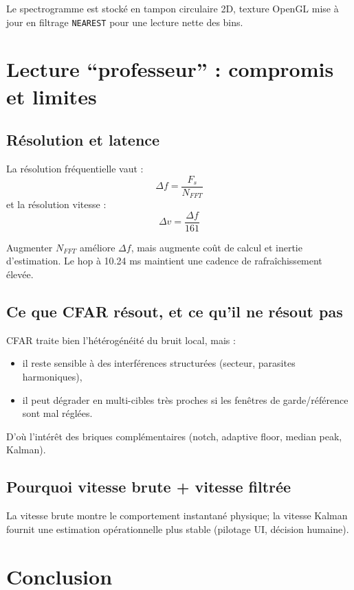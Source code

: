\documentclass[a4paper,11pt]{article}
\begin{document}
Le spectrogramme est stock\'e en tampon circulaire 2D, texture OpenGL mise \`a jour en filtrage \texttt{NEAREST} pour une lecture nette des bins.

\section{Lecture ``professeur'' : compromis et limites}

\subsection{R\'esolution et latence}

La r\'esolution fr\'equentielle vaut :
\[
\Delta f = \frac{F_s}{N_{FFT}}
\]
et la r\'esolution vitesse :
\[
\Delta v = \frac{\Delta f}{161}
\]

Augmenter \(N_{FFT}\) am\'eliore \(\Delta f\), mais augmente co\^ut de calcul et inertie d'estimation. Le hop \`a 10.24 ms maintient une cadence de rafra\^ichissement \'elev\'ee.

\subsection{Ce que CFAR r\'esout, et ce qu'il ne r\'esout pas}

CFAR traite bien l'h\'et\'erog\'en\'eit\'e du bruit local, mais :
\begin{itemize}[leftmargin=2em]
  \item il reste sensible \`a des interférences structur\'ees (secteur, parasites harmoniques),
  \item il peut d\'egrader en multi-cibles tr\`es proches si les fen\^etres de garde/r\'ef\'erence sont mal r\'egl\'ees.
\end{itemize}

D'o\`u l'int\'er\^et des briques compl\'ementaires (notch, adaptive floor, median peak, Kalman).

\subsection{Pourquoi vitesse brute + vitesse filtr\'ee}

La vitesse brute montre le comportement instantan\'e physique; la vitesse Kalman fournit une estimation op\'erationnelle plus stable (pilotage UI, d\'ecision humaine).

\section{Conclusion}
\end{document}
